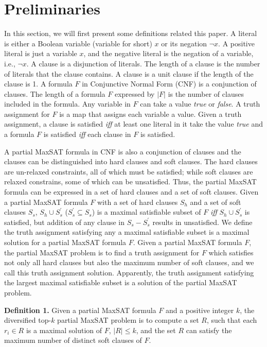 \documentclass{llncs}
\begin{document}
\section{Preliminaries}
In this section, we will first present some definitions related this paper. A literal is either a Boolean variable (variable for short) $x$ or its negation $\neg x$. A positive literal is just a variable $x$, and the negative literal is the negation of a variable, i.e., $\neg x$. A clause is a disjunction of literals. The length of a clause is the number of literals that the clause contains. A clause is a unit clause if the length of the clause is 1. A formula $F$ in Conjunctive Normal Form (CNF) is a conjunction of clauses. The length of a formula $F$ expressed by $\lvert F \rvert$ is the number of clauses included in the formula. Any variable in $F$ can take a value {\it true} or {\it false}. A truth assignment for $F$ is a map that assigns each variable a value. Given a truth assignment, a clause is satisfied {\it iff} at least one literal in it take the value  {\it true} and a formula $F$ is satisfied {\it iff} each clause in $F$ is satisfied.

A partial MaxSAT formula in CNF is also a conjunction of clauses and the clauses can be distinguished into hard clauses and soft clauses. The hard clauses are un-relaxed constraints, all of which must be satisfied; while soft clauses are relaxed constrains, some of which can be unsatisfied. Thus, the partial MaxSAT formula can be expressed in a set of hard clauses and a set of soft clauses. Given a partial MaxSAT formula $F$ with a set of hard clauses $S_{h}$ and a set of soft clauses $S_{s}$, $S_{h}\cup S^{'}_{s}$ ($S^{'}_{s}\subseteq S_{s}$) is a maximal satisfiable subset of $F$ {\it iff} $S_{h}\cup S^{'}_{s}$ is satisfied, but addition of any clause in $S_{s}-S_{s}^{'}$ results in unsatisfied. We define the truth assignment satisfying any a maximal satisfiable subset is a maximal solution for a partial MaxSAT formula $F$. Given a partial MaxSAT formula $F$, the partial MaxSAT problem is to find a truth assignment for $F$ which satisfies not only all hard clauses but also the maximum number of soft clauses, and we call this truth assignment solution. Apparently, the truth assignment satisfying the largest maximal satisfiable subset is a solution of the partial MaxSAT problem.

\medskip\noindent
{\bfseries Definition 1.} Given a partial MaxSAT formula $F$ and a positive integer $k$, the diversified top-$k$ partial MaxSAT problem is to compute a set $R$, such that each $r_{i}\in R$ is a maximal solution of $F$, $\lvert R \rvert \leq k$, and the set $R$ can satisfy the maximum number of distinct soft clauses of $F$.
\end{document}
